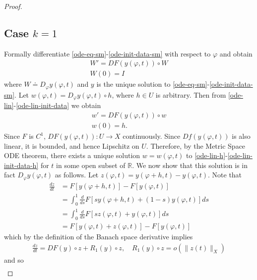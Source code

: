 \documentclass[12pt,reqno]{amsart}
\numberwithin{equation}{section}  %
\newcommand{\rr}{\mathbb{R}}
\newcommand{\vp}{\varphi}
\begin{document}
\begin{proof}
 \subsection*{Case $k=1$} 
  \label{ssec:case-k}
Formally differentiate
\eqref{ode-eq-sm}-\eqref{ode-init-data-sm} with respect to $\vp$ and obtain
%
%
%
\begin{gather}
  W' = DF(y(\vp,t)) \circ W
  \label{ode-lin}
  \\
  W(0) = I
  \label{ode-lin-init-data}
\end{gather}
%
%
where $W \doteq D_{\vp} y(\vp,t)$ and $y$ is the unique solution to
\eqref{ode-eq-sm}-\eqref{ode-init-data-sm}. Let $w(\vp,t) = D_{\vp}y(\vp,t) \circ h$, where $h \in U$ is
arbitrary. Then
from \eqref{ode-lin}-\eqref{ode-lin-init-data} we
obtain
%
%
\begin{gather}
  w' = DF(y(\vp, t)) \circ w 
  \label{ode-lin-h}
  \\
  w(0) = h.
  \label{ode-lin-init-data-h}
\end{gather}
%
%
Since $F$ is $C^{1}$, $DF(y(\vp, t)): U \to X$ continuously. Since $Df(y(\vp,
t))$ is also linear, it is bounded, and hence Lipschitz on $U$. Therefore, by
the Metric Space ODE theorem, there exists a unique solution $w = w(\vp,t)$ to
\eqref{ode-lin-h}-\eqref{ode-lin-init-data-h} for $t$ in some open subset of
$\rr$. We now show that this solution is in fact $D_{\vp} y(\vp,t)$ as follows.
Let $z(\vp,t) = y(\vp + h, t) - y(\vp,t)$. Note that
%
%
\begin{equation}
  \label{uhh}
\begin{split}
\frac{dz}{dt} 
& = F\left[ y(\vp + h, t) \right] - F\left[ y(\vp,t) \right]
\\
& = \int_{0}^{1} \frac{d}{ds} F\left[ sy(\vp+h, t) + (1-s)y(\vp,t) \right]ds
\\
& = \int_{0}^{1} \frac{d}{ds} F\left[ sz(\vp,t) + y(\vp,t) \right] ds
\\
& = F[y(\vp,t) +z(\vp, t)] - F[y(\vp, t)]
\end{split}
\end{equation}
%
%
which by the definition of the Banach space derivative implies
%
%
\begin{equation*}
\begin{split}
  \frac{dz}{dt} = DF(y) \circ z + R_{1}(y) \circ z, \quad R_{1}(y) \circ z = o(\|
  z(t) \|_{X})
\end{split}
\end{equation*}
%
%
and so
%
%
\begin{equation*}
\begin{split}

\end{split}
\end{equation*}
\end{proof}
\end{document}
